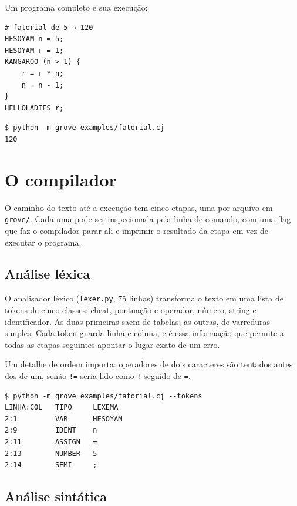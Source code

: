 \documentclass[conference]{IEEEtran}
\begin{document}
Um programa completo e sua execução:

\begin{lstlisting}[language=Grove]
# fatorial de 5 → 120
HESOYAM n = 5;
HESOYAM r = 1;
KANGAROO (n > 1) {
    r = r * n;
    n = n - 1;
}
HELLOLADIES r;
\end{lstlisting}

\begin{lstlisting}
$ python -m grove examples/fatorial.cj
120
\end{lstlisting}

\section{O compilador}\label{sec:compilador}

O caminho do texto até a execução tem cinco etapas, uma por arquivo em \texttt{grove/}. Cada uma pode ser inspecionada pela linha de comando, com uma flag que faz o compilador parar ali e imprimir o resultado da etapa em vez de executar o programa.

\subsection{Análise léxica}

O analisador léxico (\texttt{lexer.py}, 75 linhas) transforma o texto em uma lista de tokens de cinco classes: cheat, pontuação e operador, número, string e identificador. As duas primeiras saem de tabelas; as outras, de varreduras simples. Cada token guarda linha e coluna, e é essa informação que permite a todas as etapas seguintes apontar o lugar exato de um erro.

Um detalhe de ordem importa: operadores de dois caracteres são tentados antes dos de um, senão \texttt{!=} seria lido como \texttt{!} seguido de \texttt{=}.

\begin{lstlisting}
$ python -m grove examples/fatorial.cj --tokens
LINHA:COL   TIPO     LEXEMA
2:1         VAR      HESOYAM
2:9         IDENT    n
2:11        ASSIGN   =
2:13        NUMBER   5
2:14        SEMI     ;
\end{lstlisting}

\subsection{Análise sintática}
\end{document}
